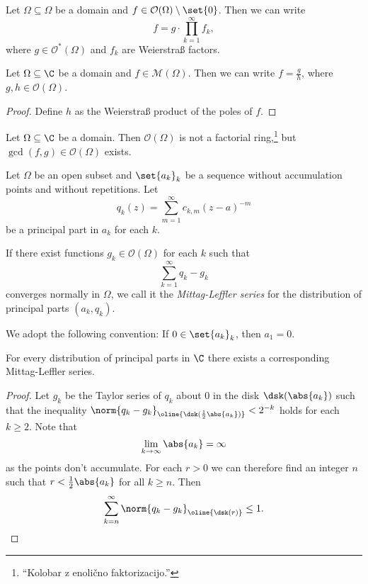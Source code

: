 \begin{izrek}
Let $\Omega \subseteq \Omega$ be a domain and
$f \in \mathcal{O}(\Omega) \setminus \set{0}$. Then we can write
\[
f = g \cdot \prod_{k=1}^\infty f_k,
\]
where $g \in \mathcal{O}^*(\Omega)$ and $f_k$ are Weierstraß
factors.
\end{izrek}

\obvs

\begin{izrek}
Let $\Omega \subseteq \C$ be a domain and
$f \in \mathcal{M}(\Omega)$. Then we can write $f = \frac{g}{h}$,
where $g, h \in \mathcal{O}(\Omega)$.
\end{izrek}

\begin{proof}
Define $h$ as the Weierstraß product of the poles of $f$.
\end{proof}

\begin{opomba}
Let $\Omega \subseteq \C$ be a domain. Then $\mathcal{O}(\Omega)$
is not a factorial ring,\footnote{``Kolobar z enolično
faktorizacijo.''} but $\gcd(f, g) \in \mathcal{O}(\Omega)$ exists.
\end{opomba}


\begin{definicija}
Let $\Omega$ be an open subset and $\set{a_k}_k$ be a sequence
without accumulation points and without repetitions. Let
\[
q_k(z) = \sum_{m=1}^\infty c_{k, m} (z - a)^{-m}
\]
be a principal part in $a_k$ for each $k$.

If there exist functions $g_k \in \mathcal{O}(\Omega)$ for each $k$
such that
\[
\sum_{k=1}^\infty q_k - g_k
\]
converges normally in $\Omega$, we call it the
\emph{Mittag-Leffler series} for the
distribution of principal parts $(a_k, q_k)$.
\end{definicija}

\begin{opomba}
We adopt the following convention: If $0 \in \set{a_k}_k$, then
$a_1 = 0$.
\end{opomba}

\begin{izrek}
\label{inf_prod:thm:MLforC}
For every distribution of principal parts in $\C$ there exists a
corresponding Mittag-Leffler series.
\end{izrek}

\begin{proof}
Let $g_k$ be the Taylor series of $q_k$ about $0$ in the disk
$\dsk(\abs{a_k})$ such that the inequality
$\norm{q_k - g_k}_{\oline{\dsk(\frac{1}{2} \abs{a_k})}} < 2^{-k}$
holds for each $k \geq 2$. Note that
\[
\lim_{k \to \infty} \abs{a_k} = \infty
\]
as the points don't accumulate. For each $r > 0$ we can therefore
find an integer $n$ such that $r < \frac{1}{2} \abs{a_k}$ for all
$k \geq n$. Then
\[
\sum_{k = n}^{\infty} \norm{q_k - g_k}_{\oline{\dsk(r)}} \leq 1.
\qedhere
\]
\end{proof}

